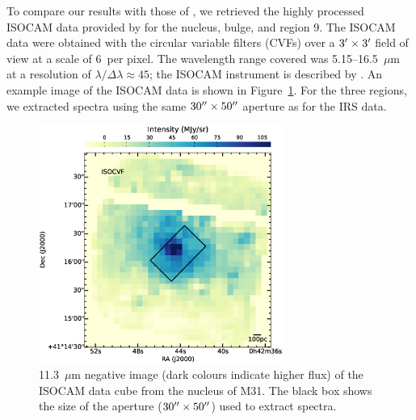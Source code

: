 To compare our results with those of  \citet{1998Cesarsky}, we retrieved the highly processed ISOCAM data provided by \citet{Boulanger_F_2005}  
for the nucleus, bulge, and region 9. 
The ISOCAM data were obtained with the circular variable filters (CVFs) over a $3\hbox{$^\prime$} \times 3\hbox{$^\prime$}$ field of view at a scale of 6\arcsec\ per pixel. 
The wavelength range covered was 5.15--16.5~$\mu$m at a resolution of $\lambda/\Delta \lambda \approx 45$; the ISOCAM instrument is described by \citet{cesarsky1996}.
An example image of the ISOCAM data is shown in Figure~\ref{isonuc}.  For the three regions, we extracted spectra using the same 
$30\hbox{$^{\prime\prime}$}\times50\hbox{$^{\prime\prime}$}$ aperture as for the IRS data. 

\begin{figure}
\centering
\includegraphics[width = 8cm]{./fig5.eps}
\caption{11.3~$\mu$m negative image (dark colours indicate higher flux) of the ISOCAM data cube from the nucleus of M31. 
The black box shows the size of the aperture ($30\hbox{$^{\prime\prime}$}\times50\hbox{$^{\prime\prime}$}$) used to extract spectra.}
\label{isonuc}
\end{figure}





